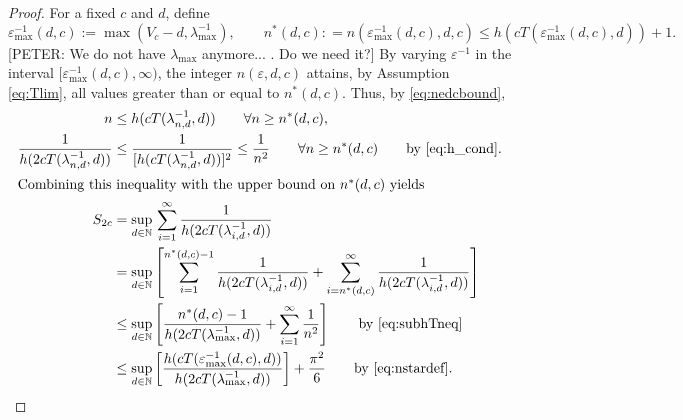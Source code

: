 \documentclass[sort&compress]{elsarticle}
\newcommand{\peter}[1]{\begingroup\color{purple}#1\endgroup}
\begin{document}
\begin{proof}
For a fixed $c$ and $d$, define
\begin{equation} \label{eq:nstardef}
	\varepsilon^{-1}_{\max}(d,c) := \max(V_c - d,\lambda_{\max}^{-1}), \qquad n^*(d,c) : = n(\varepsilon^{-1}_{\max}(d,c),d,c) \le h(cT(\varepsilon^{-1}_{\max}(d,c),d)) +1.
\end{equation}
\peter{[PETER: We do not have $\lambda_{\max}$ anymore... . Do we need it?]}
By varying $\varepsilon^{-1}$ in the interval $[\varepsilon^{-1}_{\max}(d,c),\infty)$,  the integer $n(\varepsilon,d,c)$ attains, \peter{by Assumption \eqref{eq:Tlim},} all values greater than or equal to $n^*(d,c)$.  Thus, by \eqref{eq:nedcbound},
\begin{align}
		n &\le h(cT(\lambda^{-1}_{n,d},d)) \qquad  \forall n \ge n^*(d,c), \label{eq:subhTneq}\\
		\nonumber
		\frac{1}{h(2 cT(\lambda^{-1}_{n,d},d)) } & \le \frac{1}{[h(cT(\lambda^{-1}_{n,d},d))]^{2}}  \le \frac 1{n^2}   \qquad  \forall n \ge n^*(d,c) \qquad \text{by \eqref{eq:h_cond}}. \\
		\intertext{Combining this inequality with the upper bound on $n^*(d,c)$ yields}
		\nonumber
		S_{2c} & =\sup_{d\in\mathbb{N}}  \, \sum_{i=1}^\infty \frac1{h(2cT(\lambda_{i,d}^{-1},d))} \\
		\nonumber
		&  = \sup_{d\in\mathbb{N}} \left [
		\sum_{i=1}^{n^*(d,c)-1} \frac1{h(2cT(\lambda_{i,d}^{-1},d))}
		+ \sum_{i=n^*(d,c)}^\infty \frac1{h(2cT(\lambda_{i,d}^{-1},d))}
		\right]\\
		 \nonumber
		 & \le \sup_{d\in\mathbb{N}} \left [
\frac{n^*(d,c)-1}{h(2cT(\lambda_{\max}^{-1},d))}
+ \sum_{i=1}^\infty \frac1{n^2}
\right]
 \qquad \text{by \eqref{eq:subhTneq}}\\
 \label{eq:lastone}
		 & \le \sup_{d\in\mathbb{N}} \left [
		 \frac{ h(cT(\varepsilon^{-1}_{\max}(d,c),d))}{h(2cT(\lambda_{\max}^{-1},d))}
		\right] + \frac{\pi^2}{6}
		\qquad \text{by \eqref{eq:nstardef}.}
\end{align}


\end{proof}
\end{document}
